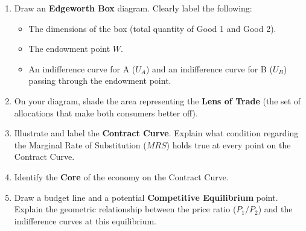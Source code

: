 \documentclass[12pt, a4paper]{article}
\begin{document}
\begin{enumerate}
    \item[(a)] Draw an \textbf{Edgeworth Box} diagram. Clearly label the following:
    \begin{itemize}
        \item The dimensions of the box (total quantity of Good 1 and Good 2).
        \item The endowment point $W$.
        \item An indifference curve for A ($U_A$) and an indifference curve for B ($U_B$) passing through the endowment point.
    \end{itemize}
    \item[(b)] On your diagram, shade the area representing the \textbf{Lens of Trade} (the set of allocations that make both consumers better off).
    \item[(c)] Illustrate and label the \textbf{Contract Curve}. Explain what condition regarding the Marginal Rate of Substitution ($MRS$) holds true at every point on the Contract Curve.
    \item[(d)] Identify the \textbf{Core} of the economy on the Contract Curve.
    \item[(e)] Draw a budget line and a potential \textbf{Competitive Equilibrium} point. Explain the geometric relationship between the price ratio ($P_1/P_2$) and the indifference curves at this equilibrium.
\end{enumerate}
\end{document}
